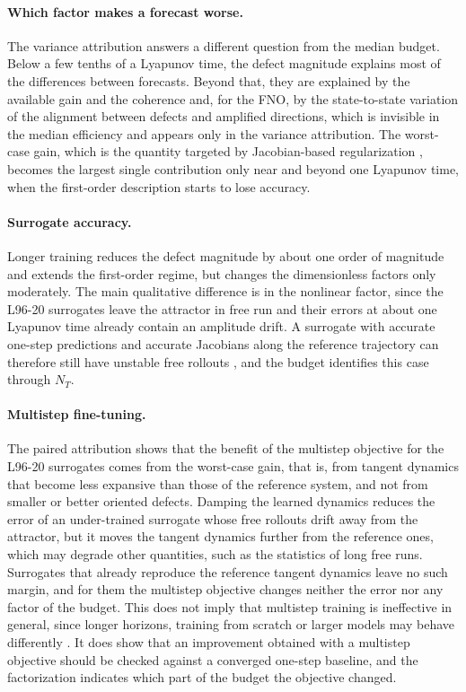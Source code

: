 \paragraph{Which factor makes a forecast worse.}
The variance attribution answers a different question from the median budget. Below a few tenths of a Lyapunov time, the defect magnitude explains most of the differences between forecasts. Beyond that, they are explained by the available gain and the coherence and, for the FNO, by the state-to-state variation of the alignment between defects and amplified directions, which is invisible in the median efficiency and appears only in the variance attribution. The worst-case gain, which is the quantity targeted by Jacobian-based regularization \citep{pan2018,nie2026,pervez2026}, becomes the largest single contribution only near and beyond one Lyapunov time, when the first-order description starts to lose accuracy.

\paragraph{Surrogate accuracy.}
Longer training reduces the defect magnitude by about one order of magnitude and extends the first-order regime, but changes the dimensionless factors only moderately. The main qualitative difference is in the nonlinear factor, since the L96-20 surrogates leave the attractor in free run and their errors at about one Lyapunov time already contain an amplitude drift. A surrogate with accurate one-step predictions and accurate Jacobians along the reference trajectory can therefore still have unstable free rollouts \citep{park2024}, and the budget identifies this case through $N_T$.

\paragraph{Multistep fine-tuning.}
The paired attribution shows that the benefit of the multistep objective for the L96-20 surrogates comes from the worst-case gain, that is, from tangent dynamics that become less expansive than those of the reference system, and not from smaller or better oriented defects. Damping the learned dynamics reduces the error of an under-trained surrogate whose free rollouts drift away from the attractor, but it moves the tangent dynamics further from the reference ones, which may degrade other quantities, such as the statistics of long free runs. Surrogates that already reproduce the reference tangent dynamics leave no such margin, and for them the multistep objective changes neither the error nor any factor of the budget. This does not imply that multistep training is ineffective in general, since longer horizons, training from scratch or larger models may behave differently \citep{brandstetter2022,list2025}. It does show that an improvement obtained with a multistep objective should be checked against a converged one-step baseline, and the factorization indicates which part of the budget the objective changed.

